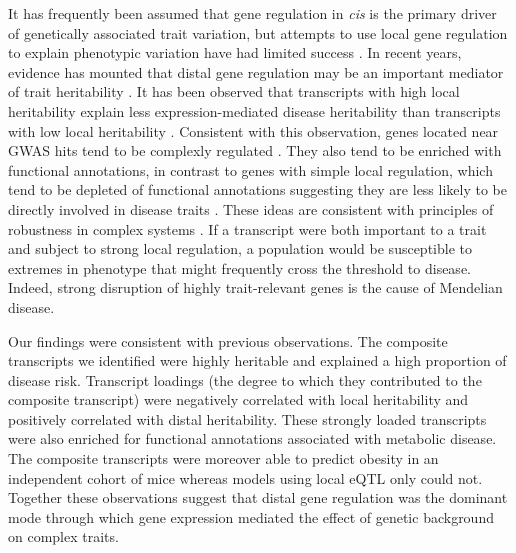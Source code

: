 \documentclass[
]{article}
\begin{document}
It has frequently been assumed that gene regulation in \textit{cis} is
the primary driver of genetically associated trait variation, but
attempts to use local gene regulation to explain phenotypic variation
have had limited success \cite{pmid32912663, pmid36515579}. In recent
years, evidence has mounted that distal gene regulation may be an
important mediator of trait heritability \cite{pmid32424349, 
pmid37857933, pmid31051098}. It has been observed that transcripts with
high local heritability explain less expression-mediated disease
heritability than transcripts with low local heritability
\cite{pmid32424349}. Consistent with this observation, genes located
near GWAS hits tend to be complexly regulated \cite{pmid37857933}. They
also tend to be enriched with functional annotations, in contrast to
genes with simple local regulation, which tend to be depleted of
functional annotations suggesting they are less likely to be directly
involved in disease traits \cite{pmid37857933}. These ideas are
consistent with principles of robustness in complex systems
\cite{pmid29782925, 
pmid12082173, pmid27304973}. If a transcript were both important to a
trait and subject to strong local regulation, a population would be
susceptible to extremes in phenotype that might frequently cross the
threshold to disease. Indeed, strong disruption of highly trait-relevant
genes is the cause of Mendelian disease.

Our findings were consistent with previous observations. The composite
transcripts we identified were highly heritable and explained a high
proportion of disease risk. Transcript loadings (the degree to which
they contributed to the composite transcript) were negatively correlated
with local heritability and positively correlated with distal
heritability. These strongly loaded transcripts were also enriched for
functional annotations associated with metabolic disease. The composite
transcripts were moreover able to predict obesity in an independent
cohort of mice whereas models using local eQTL only could not. Together
these observations suggest that distal gene regulation was the dominant
mode through which gene expression mediated the effect of genetic
background on complex traits.
\end{document}
